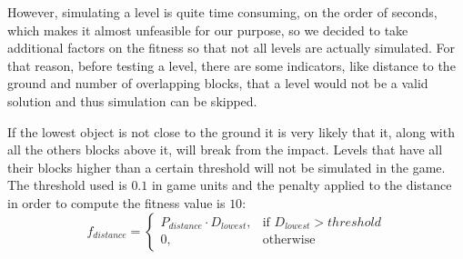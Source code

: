 \documentclass[sigconf]{acmart}
\begin{document}


However, simulating a level is quite time consuming, on the order of
seconds, which makes it almost unfeasible for our purpose, so we
decided to take additional factors on the fitness so that not all
levels are actually simulated. 
For that reason, before testing a level, there are some indicators, like
distance to the ground and number of overlapping blocks, that a level would 
not be a valid solution
and thus simulation can be skipped.

If the lowest object is not close to the ground it is very likely that
it, along with all the others blocks above it, 
will break from the impact. Levels that have all their blocks higher than a 
certain threshold will not be simulated in the game. The threshold used is 
$0.1$ in game units and the penalty applied to the distance in order
to compute the fitness value is $10$:
$$f_{distance} = 
\begin{cases}
P_{distance}\cdot D_{lowest}, & \text{if } D_{lowest} > threshold\\
0, & \text{otherwise}
\end{cases}
$$

\end{document}
